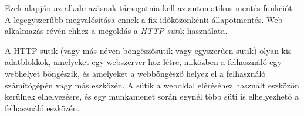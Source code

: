 Ezek alapján az alkalmazásnak támogatnia kell az automatikus mentés funkciót. A legegyszerűbb megvalósítása ennek a fix időközönkénti állapotmentés. Web alkalmazás révén ehhez a megoldás a \textit{HTTP-süti}k használata.

A HTTP-sütik (vagy más néven böngészősütik vagy egyszerűen sütik) olyan kis adatblokkok, amelyeket egy webszerver hoz létre, miközben a felhasználó egy webhelyet böngészik, és amelyeket a  webböngésző helyez el a felhasználó számítógépén vagy más eszközén. A sütik a weboldal eléréséhez használt eszközön kerülnek elhelyezésre, és egy munkamenet során egynél több süti is elhelyezhető a felhasználó eszközén.





